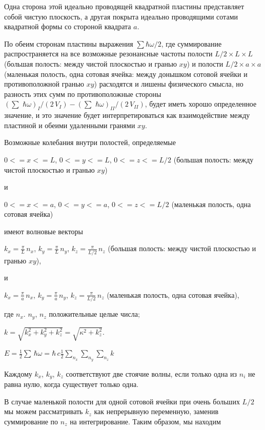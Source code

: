 \documentclass[11pt]{article}
\begin{document}
Одна сторона этой идеально проводящей квадратной пластины представляет
собой чистую плоскость, а другая покрыта идеально проводящими сотами
квадратной формы со стороной квадрата \(a\).

По обеим сторонам пластины выражения \(\sum\hbar\omega\big/2\), где
суммирование распространяется на все возможные резонансные частоты
полости \(L/2\times L\times L\) (большая полость: между чистой
плоскостью и гранью \(xy\)) и полости \(L/2\times a\times a\) (маленькая
полость, одна сотовая ячейка: между донышком сотовой ячейки и
противоположной гранью \(xy\)) расходятся и лишены физического смысла,
но разность этих сумм по противоположные стороны
\(\left(\sum\,\,\hbar\omega\right)_{I}\big/{\left(2\,V_{ I}\right)} - \left(\sum\,\,\hbar\omega\right)_{II}\big/{\left(2\,V_{II}\right)}\),
будет иметь хорошо определенное значение, и это значение будет
интерпретироваться как взаимодействие между пластиной и обеими
удаленными гранями \(xy\).

    Возможные колебания внутри полостей, определяемые

    \(0<=x<=L\), \(0<=y<=L\), \(0<=z<=L/2\) (большая полость: между чистой
плоскостью и гранью \(xy\))

    и

    \(0<=x<=a\), \(0<=y<=a\), \(0<=z<=L/2\) (маленькая полость, одна сотовая
ячейка)

    имеют волновые векторы

    \(k_x = \frac{\pi}{L}\,n_x\), \(k_y = \frac{\pi}{L}\,n_y\),
\(k_z = \frac{\pi}{L/2}\,n_z\) (большая полость: между чистой плоскостью
и гранью \(xy\)),

    и

    \(k_x = \frac{\pi}{a}\,n_x\), \(k_y = \frac{\pi}{a}\,n_y\),
\(k_z = \frac{\pi}{L/2}\,n_z\) (маленькая полость, одна сотовая ячейка),

где \(n_x\). \(n_y\), \(n_z\) положительные целые числа;

    \(k = \sqrt{k_x^2+k_y^2+k_z^2} = \sqrt{\kappa^2+k_z^2}\).

    \(E = \frac{1}{2}\sum\,\hbar\omega = \hbar\,c\frac{1}{2}\sum\limits_{n_x}^{}\sum\limits_{n_y}^{}\sum\limits_{n_z}^{}k\)

    Каждому \(k_x\), \(k_y\), \(k_z\) соответствуют две стоячие волны, если
только одна из \(n_i\) не равна нулю, когда существует только одна.

    В случае маленькой полости для одной сотовой ячейки при очень больших
\(L/2\) мы можем рассматривать \(k_z\) как непрерывную переменную,
заменив суммирование по \(n_z\) на интегрирование. Таким образом, мы
находим
\end{document}
